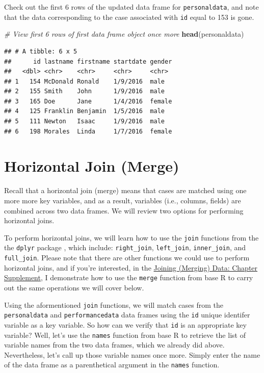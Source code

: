 \documentclass[]{book}
\newenvironment{Shaded}{\begin{snugshade}}{\end{snugshade}}
\newcommand{\KeywordTok}[1]{\textcolor[rgb]{0.13,0.29,0.53}{\textbf{#1}}}
\newcommand{\CommentTok}[1]{\textcolor[rgb]{0.56,0.35,0.01}{\textit{#1}}}
\newcommand{\NormalTok}[1]{#1}
\begin{document}
Check out the first 6 rows of the updated data frame for
\texttt{personaldata}, and note that the data corresponding to the case
associated with \texttt{id} equal to 153 is gone.

\begin{Shaded}
\begin{Highlighting}[]
\CommentTok{# View first 6 rows of first data frame object once more}
\KeywordTok{head}\NormalTok{(personaldata)}
\end{Highlighting}
\end{Shaded}

\begin{verbatim}
## # A tibble: 6 x 5
##      id lastname firstname startdate gender
##   <dbl> <chr>    <chr>     <chr>     <chr> 
## 1   154 McDonald Ronald    1/9/2016  male  
## 2   155 Smith    John      1/9/2016  male  
## 3   165 Doe      Jane      1/4/2016  female
## 4   125 Franklin Benjamin  1/5/2016  male  
## 5   111 Newton   Isaac     1/9/2016  male  
## 6   198 Morales  Linda     1/7/2016  female
\end{verbatim}

\hypertarget{horizontaljoin}{\section{Horizontal Join
(Merge)}\label{horizontaljoin}}

Recall that a horizontal join (merge) means that cases are matched using
one more more key variables, and as a result, variables (i.e., columns,
fields) are combined across two data frames. We will review two options
for performing horizontal joins.

To perform horizontal joins, we will learn how to use the \texttt{join}
functions from the the \texttt{dplyr} package \citep{R-dplyr}, which
include: \texttt{right\_join}, \texttt{left\_join},
\texttt{inner\_join}, and \texttt{full\_join}. Please note that there
are other functions we could use to perform horizontal joins, and if
you're interested, in the \protect\hyperlink{join_supplement}{Joining
(Merging) Data: Chapter Supplement}, I demonstrate how to use the
\texttt{merge} function from base R to carry out the same operations we
will cover below.

Using the aformentioned \texttt{join} functions, we will match cases
from the \texttt{personaldata} and \texttt{performancedata} data frames
using the \texttt{id} unique identifer variable as a key variable. So
how can we verify that \texttt{id} is an appropriate key variable? Well,
let's use the \texttt{names} function from base R to retrieve the list
of variable names from the two data frames, which we already did above.
Nevertheless, let's call up those variable names once more. Simply enter
the name of the data frame as a parenthetical argument in the
\texttt{names} function.
\end{document}

